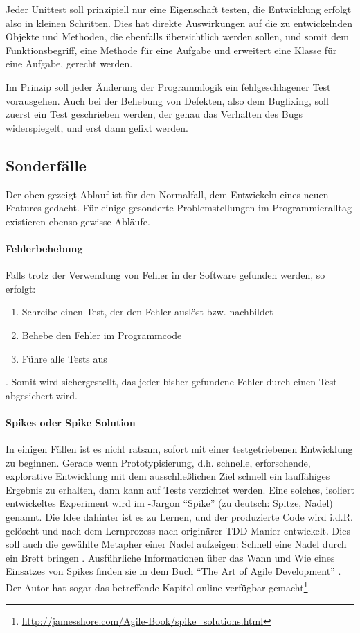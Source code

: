   Jeder Unittest soll prinzipiell nur eine Eigenschaft testen, die Entwicklung erfolgt also in kleinen Schritten. Dies hat direkte Auswirkungen auf die zu entwickelnden Objekte und Methoden, die ebenfalls übersichtlich werden sollen, und somit dem Funktionsbegriff, eine Methode für eine Aufgabe und erweitert eine Klasse für eine Aufgabe, gerecht werden.
  
  Im Prinzip soll jeder Änderung der Programmlogik ein fehlgeschlagener Test vorausgehen. Auch bei der Behebung von Defekten, also dem Bugfixing, soll zuerst ein Test geschrieben werden, der genau das Verhalten des Bugs widerspiegelt, und erst dann gefixt werden.
  
  \subsection{Sonderfälle}
  
  Der oben gezeigt Ablauf ist für den Normalfall, dem Entwickeln eines neuen Features gedacht. Für einige gesonderte Problemstellungen im Programmieralltag existieren ebenso gewisse Abläufe.
  
  \paragraph{Fehlerbehebung} Falls trotz der Verwendung von  Fehler in der Software gefunden werden, so erfolgt:
  \begin{enumerate}
   \item Schreibe einen Test, der den Fehler auslöst bzw. nachbildet
   \item Behebe den Fehler im Programmcode
   \item Führe alle Tests aus
  \end{enumerate}.
  Somit wird sichergestellt, das jeder bisher gefundene Fehler durch einen Test abgesichert wird.
  \paragraph{Spikes oder Spike Solution} In einigen Fällen ist es nicht ratsam, sofort mit einer testgetriebenen Entwicklung zu beginnen. Gerade wenn Prototypisierung, d.h. schnelle, erforschende, explorative Entwicklung mit dem ausschließlichen Ziel schnell ein lauffähiges Ergebnis zu erhalten, dann kann auf Tests verzichtet werden. Eine solches, isoliert entwickeltes Experiment wird im -Jargon "`Spike"' (zu deutsch: Spitze, Nadel) genannt. Die Idee dahinter ist es zu Lernen, und der produzierte Code wird i.d.R. gelöscht und nach dem Lernprozess nach originärer TDD-Manier entwickelt. Dies soll auch die gewählte Metapher einer Nadel aufzeigen: Schnell eine Nadel durch ein Brett bringen \citep{shore_art_2007}. Ausführliche Informationen über das Wann und Wie eines Einsatzes von Spikes finden sie in dem Buch "`The Art of Agile Development"' \citep{shore_art_2007}. Der Autor hat sogar das betreffende Kapitel online verfügbar gemacht\footnote{\url{http://jamesshore.com/Agile-Book/spike_solutions.html}}.

